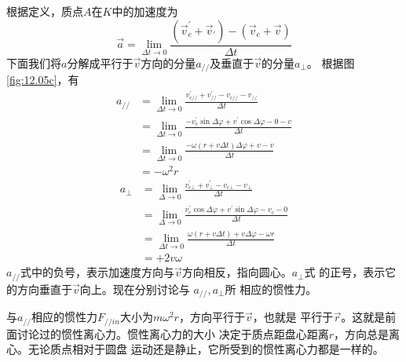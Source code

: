 \documentclass[../outline-of-mechanics.tex]{subfiles}
\begin{document}
根据定义，质点$ A $在$ K $中的加速度为
\begin{equation*}
  \vec{a} = \lim _ { \Delta t \to 0 } \frac { ( \vec{v} _ { c } ^ { \prime } + \vec{v} _ { \prime } ) - ( \vec{v} _ { c } + \vec{v} ) } { \Delta t }
\end{equation*}
下面我们将$ a $分解成平行于$\vec{v}$方向的分量$ a _ {//} $及垂直于$\vec{v}$的分量$ a _ \bot $。
根据图\ref{fig:12.05c}，有\\
\begin{equation}\label{eqn:12.02.04}
  \begin{aligned}
    a _ { // } & = \lim_{ \Delta t \to 0 } \frac { v _ { c// } ^ { \prime } + v _ { // } ^ { \prime } - v _ { c// } - v _ { // } } { \Delta t } \\
               & =\lim _{\Delta t \to 0} \frac{-v_{c}^{\prime} \sin \Delta \varphi+v^{\prime} \cos \Delta \varphi-0-v}{\Delta t}                \\
               & =\lim _{\Delta t \to 0} \frac{-\omega(r+v \Delta t) \Delta \varphi+v-v}{\Delta t}                                              \\
               & =-\omega^{2} r
  \end{aligned}
\end{equation}
\begin{equation}\label{eqn:12.02.05}
  \begin{aligned}
    a_{\bot} & =\lim _{\Delta \rightarrow 0} \frac{v_{c \bot}^{\prime}+v_{\bot}^{\prime}-v_{c \bot}-v_{\bot}}{\Delta t}                 \\
             & =\lim _{\Delta \rightarrow 0} \frac{v_{c}^{\prime} \cos \Delta \varphi+v^{\prime} \sin \Delta \varphi-v_{c}-0}{\Delta t} \\
             & =\lim _{\Delta t \rightarrow 0} \frac{\omega(r+v \Delta t)+v \Delta \varphi-\omega r}{\Delta t}                          \\
             & =+2 v \omega
  \end{aligned}
\end{equation}
$ a_{//} $式中的负号，表示加速度方向与$\vec{v}$方向相反，指向圆心。$ a_{\bot} $式
的正号，表示它的方向垂直于$\vec{v}$向上。现在分别讨论与 $ a_{//}, a_{\bot}$所
相应的惯性力。

与$ a_{//} $相应的惯性力$ F_{//in} $大小为$ m\omega ^ 2 r $，方向平行于$\vec{v}$，也就是
平行于$\vec{r}$。这就是前面讨论过的惯性离心力。惯性离心力的大小
决定于质点距盘心距离$ r $，方向总是离心。无论质点相对于圆盘
运动还是静止，它所受到的惯性离心力都是一样的。
\end{document}
